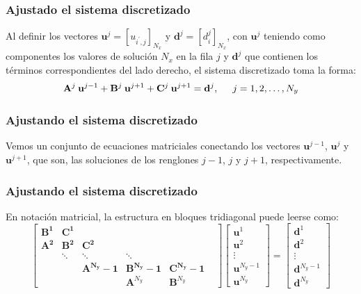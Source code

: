 \begin{frame}
\frametitle{Ajustado el sistema discretizado}
Al definir los vectores $\mathbf{u}^{j} = [u_{i^{\prime}, j}]_{N_{x}}$ y $\mathbf{d}^{j} = [d_{i}^{j}]_{N_{x}}$, con $\mathbf{u}^{j}$ teniendo como componentes los valores de solución $N_{x}$ en la fila $j$ y $\mathbf{d}^{j}$ que contienen los términos correspondientes del lado derecho, el sistema discretizado toma la forma:
\begin{equation}
\mathbf{A}^{j} \: \mathbf{u}^{j-1} + \mathbf{B}^{j} \: \mathbf{u}^{j+1} +  \mathbf{C}^{j} \: \mathbf{u}^{j+1} = \mathbf{d}^{j}, \hspace{0.5cm} j = 1, 2, \ldots, N_{y}
\label{eq:ecuacion_13_17}
\end{equation}
\end{frame}
\begin{frame}
\frametitle{Ajustando el sistema discretizado}
Vemos un conjunto de ecuaciones matriciales conectando los vectores $\mathbf{u}^{j-1}$, $\mathbf{u}^{j}$ y $\mathbf{u}^{j+1}$, que son, las soluciones de los renglones $j-1$, $j$ y $j+1$, respectivamente.
\end{frame}
\begin{frame}
\frametitle{Ajustando el sistema discretizado}
En notación matricial, la estructura en bloques tridiagonal puede leerse como:
\pause
\fontsize{12}{12}\selectfont
\begin{equation}
\begin{bmatrix}
\mathbf{B^{1}} & \mathbf{C^{1}} & & & \\
\mathbf{A^{2}} & \mathbf{B^{2}} & \mathbf{C^{2}} & & \\
 & \ddots & \ddots & \ddots & \\
 & & \mathbf{A^{N_{y}}-1} & \mathbf{B^{N_{y}}-1} & \mathbf{C^{N_{y}}-1}& \\
 & & & \mathbf{A}^{N_{y}} & \mathbf{B}^{N_{y}} 
\end{bmatrix}
\begin{bmatrix}
\mathbf{u}^{1} \\
\mathbf{u}^{2} \\
\vdots \\
\mathbf{u}^{N_{y} - 1} \\
\mathbf{u}^{N_{y}}
\end{bmatrix} = 
\begin{bmatrix}
\mathbf{d}^{1} \\
\mathbf{d}^{2} \\
\vdots \\
\mathbf{d}^{N_{y} - 1} \\
\mathbf{d}^{N_{y}}
\end{bmatrix}
\label{eq:ecuacion_13_18}
\end{equation}
\end{frame}
